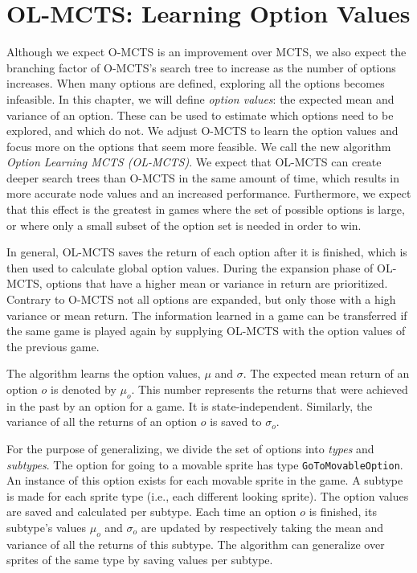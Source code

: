 \chapter{OL-MCTS: Learning Option Values} 
\label{sec:learning} 

Although we expect O-MCTS is an improvement over MCTS, we also expect the
branching factor of O-MCTS's search tree to increase as the number of options
increases.  When many options are defined, exploring all the options becomes
infeasible. In this chapter, we will define \emph{option values}: the expected
mean and variance of an option. These can be used to estimate which options need
to be explored, and which do not. We adjust O-MCTS to learn the option values
and focus more on the options that seem more feasible. We call the new algorithm
\emph{Option Learning MCTS (OL-MCTS)}. We expect that OL-MCTS can create deeper
search trees than O-MCTS in the same amount of time, which results in more
accurate node values and an increased performance. Furthermore, we expect that
this effect is the greatest in games where the set of possible options is large,
or where only a small subset of the option set is needed in order to win.

In general, OL-MCTS saves the return of each option after it is finished, which
is then used to calculate global option values. During the expansion phase of
OL-MCTS, options that have a higher mean or variance in return are prioritized.
Contrary to O-MCTS not all options are expanded, but only those with a high
variance or mean return. The information learned in a game can be transferred if
the same game is played again by supplying OL-MCTS with the option values of the
previous game.

The algorithm learns the option values, $\mu$ and $\sigma$. The expected mean
return of an option $o$ is denoted by $\mu_o$. This number represents the
returns that were achieved in the past by an option for a game. It is
state-independent. Similarly, the variance of all the returns of an option $o$
is saved to $\sigma_o$.

For the purpose of generalizing, we divide the set of options into \emph{types}
and \emph{subtypes}. The option for going to a movable sprite has type
\texttt{GoToMovableOption}. An instance of this option exists for each movable
sprite in the game. A subtype is made for each sprite type (i.e., each
different looking sprite). The option values are saved and calculated per
subtype. Each time an option $o$ is finished, its subtype's values $\mu_o$ and
$\sigma_o$ are updated by respectively taking the mean and variance of all the
returns of this subtype. The algorithm can generalize over sprites of the same
type by saving values per subtype.

